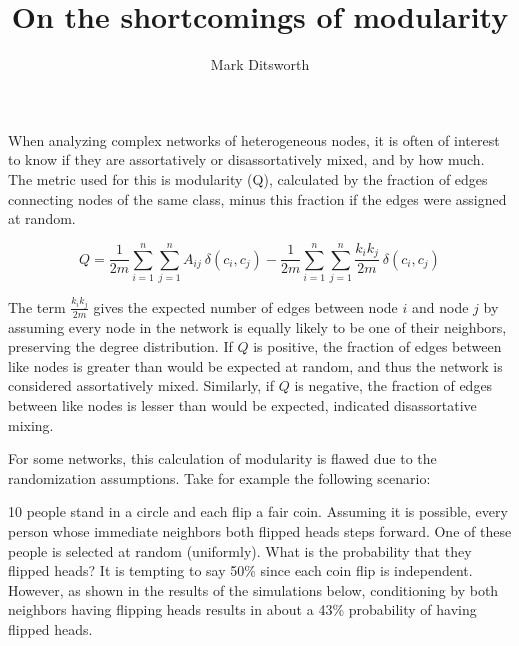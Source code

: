 \documentclass[11pt]{article}
\title{On the shortcomings of modularity}
\author{Mark Ditsworth}
\begin{document}
    
    
    \maketitle
    
    

    
    When analyzing complex networks of heterogeneous nodes, it is often of
interest to know if they are assortatively or disassortatively mixed,
and by how much. The metric used for this is modularity (Q), calculated
by the fraction of edges connecting nodes of the same class, minus this
fraction if the edges were assigned at random.

\[
Q = \frac{1}{2m} \sum_{i=1}^{n}\sum_{j=1}^{n} A_{ij} ~\delta(c_i,c_j) - \frac{1}{2m}\sum_{i=1}^{n}\sum_{j=1}^{n} \frac{k_ik_j}{2m} ~\delta(c_i,c_j)
\]

The term \(\frac{k_ik_j}{2m}\) gives the expected number of edges
between node \(i\) and node \(j\) by assuming every node in the network
is equally likely to be one of their neighbors, preserving the degree
distribution. If \(Q\) is positive, the fraction of edges between like
nodes is greater than would be expected at random, and thus the network
is considered assortatively mixed. Similarly, if \(Q\) is negative, the
fraction of edges between like nodes is lesser than would be expected,
indicated disassortative mixing.

For some networks, this calculation of modularity is flawed due to the
randomization assumptions. Take for example the following scenario:

10 people stand in a circle and each flip a fair coin. Assuming it is
possible, every person whose immediate neighbors both flipped heads
steps forward. One of these people is selected at random (uniformly).
What is the probability that they flipped heads? It is tempting to say
50\% since each coin flip is independent. However, as shown in the
results of the simulations below, conditioning by both neighbors having
flipping heads results in about a 43\% probability of having flipped
heads.
\end{document}
